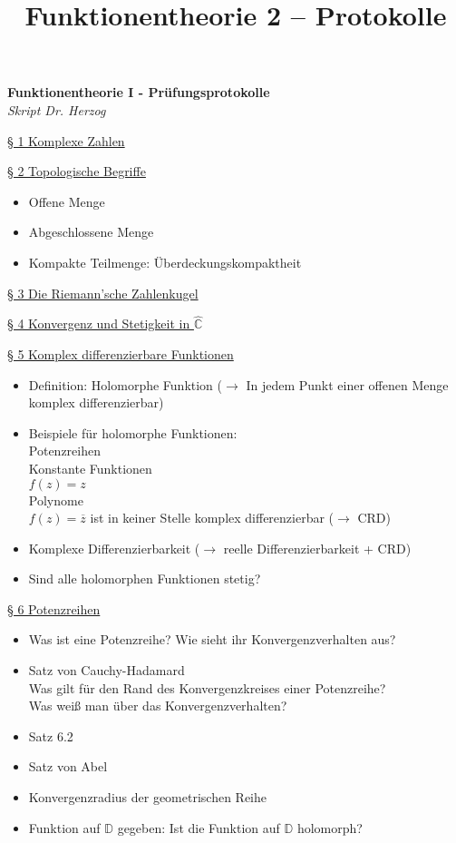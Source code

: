 \documentclass[11pt]{article}
\title{Funktionentheorie 2 -- Protokolle}
\newcommand{\C}{\mathbb{C}}
\newcommand{\D}{\mathbb{D}}
\begin{document}
\begin{center}
{\Large \textbf{Funktionentheorie I - Prüfungsprotokolle}} \\
\textit{Skript Dr. Herzog}
\end{center}

\underline{§ 1 Komplexe Zahlen}

\underline{§ 2 Topologische Begriffe}
\vspace{-0.5cm}
\begin{itemize}
\item Offene Menge
\item Abgeschlossene Menge
\item Kompakte Teilmenge: Überdeckungskompaktheit
\end{itemize}

\underline{§ 3 Die Riemann'sche Zahlenkugel}

\underline{§ 4 Konvergenz und Stetigkeit in $\hat{\C}$} 

\underline{§ 5 Komplex differenzierbare Funktionen}
\vspace{-0.5cm}
\begin{itemize}
\item Definition: Holomorphe Funktion ($\rightarrow$ In jedem Punkt einer offenen Menge komplex differenzierbar)
\item Beispiele für holomorphe Funktionen: \\
\quad Potenzreihen \\
\quad Konstante Funktionen \\
\quad $f(z) = z$ \\
\quad Polynome \\
\quad $f(z) = \overline{z}$ ist in keiner Stelle komplex differenzierbar ($\rightarrow$ CRD)
\item Komplexe Differenzierbarkeit ($\rightarrow$ reelle Differenzierbarkeit + CRD)
\item Sind alle holomorphen Funktionen stetig?
\end{itemize}

\underline{§ 6 Potenzreihen}
\vspace{-0.5cm}
\begin{itemize}
\item Was ist eine Potenzreihe? Wie sieht ihr Konvergenzverhalten aus?
\item Satz von Cauchy-Hadamard \\
\quad Was gilt für den Rand des Konvergenzkreises einer Potenzreihe? \\
\quad Was weiß man über das Konvergenzverhalten?
\item Satz 6.2
\item Satz von Abel
\item Konvergenzradius der geometrischen Reihe
\item Funktion auf $\D$ gegeben: Ist die Funktion auf $\D$ holomorph?
\end{itemize}
\end{document}
